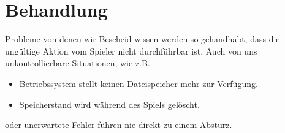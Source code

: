 %



\section{Behandlung}
\label{Abschnitt:Ausnahmen:Behandlungen}

Probleme von denen wir Bescheid wissen werden so gehandhabt, dass die ungültige Aktion vom Spieler nicht durchführbar ist. Auch von uns unkontrollierbare Situationen, wie z.B.

\begin{itemize}

	\item Betriebssystem stellt keinen Dateispeicher mehr zur Verfügung.
	
	\item Speicherstand wird während des Spiels gelöscht.

\end{itemize}

oder unerwartete Fehler führen nie direkt zu einem Absturz.\\


